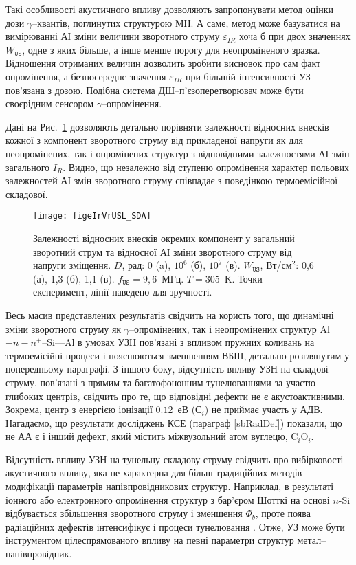 Такі особливості акустичного впливу дозволяють запропонувати метод оцінки дози $\gamma$--квантів, поглинутих структурою МН.
А саме, метод може базуватися на вимірюванні АІ зміни величини зворотного струму $\varepsilon_{IR}$ хоча б при двох значеннях $W_\mathtt{US}$,
одне з яких більше, а інше менше порогу для неопроміненого зразка.
Відношення отриманих величин дозволить зробити висновок про сам факт опромінення,
а безпосереднє значення $\varepsilon_{IR}$ при більшій інтенсивності УЗ пов’язана з дозою.
Подібна система ДШ--п’єзоперетворювач може бути своєрідним сенсором $\gamma$--опромінення.

Дані на Рис.~\ref{figeIrVrUSL_SDA} дозволяють детально порівняти залежності відносних внесків кожної з компонент зворотного струму від прикладеної напруги
як для неопромінених, так і опромінених структур з відповідними залежностями АІ змін загального $I_R$.
Видно, що незалежно від ступеню опромінення характер польових залежностей АІ змін зворотного струму співпадає з поведінкою термоемісійної складової.


\begin{figure}
\center
\texttt{[image: figeIrVrUSL\_SDA]}
\caption{\label{figeIrVrUSL_SDA}
Залежності відносних внесків окремих компонент у загальний зворотний струм
та відносної АІ зміни зворотного струму від напруги зміщення.
$D$, рад: 0 (a), $10^6$ (б), $10^7$ (в).
$W_\mathtt{US}$, Вт/см$^2$: 0,6 (а), 1,3 (б), 1,1 (в).
$f_\mathtt{US}=9,6$~МГц.
$T=305$~K.
Точки --- експеримент,
лінії наведено для зручності.
}%
\end{figure}


Весь масив представлених результатів свідчить на користь того, що
динамічні зміни зворотного струму як $\gamma$--опромінених, так і неопромінених структур Al$-n-n^+$--Si---Al в умовах УЗН
пов’язані з впливом пружних коливань на термоемісійні процеси і пояснюються зменшенням ВБШ, детально розглянутим у попередньому параграфі.
З іншого боку, відсутність впливу УЗН на складові струму, пов’язані з прямим та багатофононним тунелюваннями за участю глибоких центрів,
свідчить про те, що відповідні дефекти не є акустоактивними.
Зокрема, центр з енергією іонізації $0.12$~еВ (С$_i$) не приймає участь у АДВ.
Нагадаємо, що результати досліджень КСЕ (параграф \ref{sbRadDef}) показали, що не АА є і інший дефект, який містить міжвузольний атом вуглецю, C$_i$O$_i$.

Відсутність впливу УЗН на тунельну складову струму свідчить про вибірковості акустичного впливу, яка не характерна для більш традиційних методів модифікації параметрів напівпровідникових структур.
Наприклад, в результаті іонного або електронного опромінення структур з бар'єром Шотткі на основі $n$-Si відбувається збільшення зворотного струму
і зменшення $\Phi_b$,
проте поява радіаційних дефектів інтенсифікує і процеси тунелювання \cite{Kumar2,Rao,SINGH2001}.
Отже, УЗ може бути інструментом цілеспрямованого впливу на певні параметри структур метал--напівпровідник.


